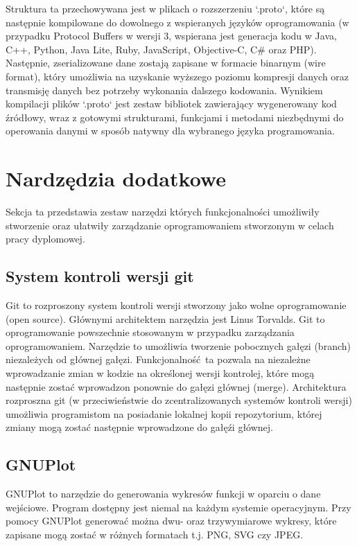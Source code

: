 \documentclass[a4paper,12pt,twoside,openany]{report}
\begin{document}
Struktura ta przechowywana jest w plikach o rozszerzeniu `.proto`, które są następnie kompilowane do dowolnego z wspieranych języków oprogramowania 
(w przypadku Protocol Buffers w wersji 3, wspierana jest generacja kodu w Java, C++, Python, Java Lite, Ruby, JavaScript, Objective-C, C\# oraz PHP).
Następnie, zserializowane dane zostają zapisane w formacie binarnym (wire format), który umożliwia na uzyskanie wyższego poziomu kompresji danych oraz transmisję danych 
bez potrzeby wykonania dalszego kodowania. 
Wynikiem kompilacji plików `.proto` jest zestaw bibliotek zawierający wygenerowany kod źródłowy, wraz z gotowymi strukturami, funkcjami i metodami niezbędnymi do 
operowania danymi w sposób natywny dla wybranego języka programowania.

\section{Nardzędzia dodatkowe}

Sekcja ta przedstawia zestaw narzędzi których funkcjonalności umożliwiły stworzenie oraz ułatwiły zarządzanie oprogramowaniem stworzonym w celach
pracy dyplomowej. 

\subsection{System kontroli wersji git}
Git to rozproszony system kontroli wersji stworzony jako wolne oprogramowanie (open source). 
Głównymi architektem narzędzia jest Linus Torvalds. Git to oprogramowanie powszechnie stosowanym w przypadku zarządzania oprogramowaniem.
Narzędzie to umożliwia tworzenie pobocznych gałęzi (branch) niezależych od głównej gałęzi. Funkcjonalność ta pozwala na niezależne wprowadzanie zmian
w kodzie na określonej wersji kontrolej, które mogą następnie zostać wprowadzon ponownie do gałęzi głównej (merge).
Architektura rozproszna git (w przeciwieństwie do zcentralizowanych systemów kontroli wersji) umożliwia programistom na posiadanie lokalnej kopii repozytorium,
której zmiany mogą zostać następnie wprowadzone do gałęźi głównej.

\subsection{GNUPlot}

GNUPlot to narzędzie do generowania wykresów funkcji w oparciu o dane wejściowe. Program dostępny jest niemal na każdym systemie operacyjnym.
Przy pomocy GNUPlot generować można dwu- oraz trzywymiarowe wykresy, które zapisane mogą zostać w różnych formatach t.j. PNG, SVG czy JPEG.
\end{document}
